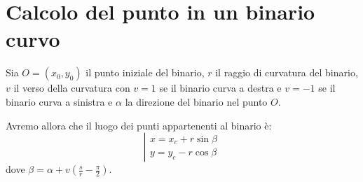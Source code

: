 \section{Calcolo del punto in un binario curvo}
Sia $O=(x_0, y_0)$ il punto iniziale del binario, $r$ il raggio di curvatura
del binario, $v$ il verso della curvatura con $v=1$ se il binario curva a
destra e $v=-1$ se il binario curva a sinistra e $\alpha$ la direzione del
binario nel punto $O$.

Avremo allora che il luogo dei punti appartenenti al binario \`e:
\begin{equation}
  \label{eq:curve1}
  \left|
  \begin{array}{l}
    x=x_c+r\sin\beta
    \\
    y=y_c-r\cos\beta
  \end{array}
  \right.
\end{equation}
dove $\beta=\alpha+v(\frac{s}{r}-\frac{\pi}{2})$.

